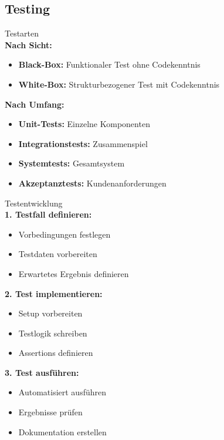 \subsection{Testing}

\begin{definition}{Testarten}\\
\textbf{Nach Sicht:}
\begin{itemize}
    \item \textbf{Black-Box:} Funktionaler Test ohne Codekenntnis
    \item \textbf{White-Box:} Strukturbezogener Test mit Codekenntnis
\end{itemize}

\textbf{Nach Umfang:}
\begin{itemize}
    \item \textbf{Unit-Tests:} Einzelne Komponenten
    \item \textbf{Integrationstests:} Zusammenspiel
    \item \textbf{Systemtests:} Gesamtsystem
    \item \textbf{Akzeptanztests:} Kundenanforderungen
\end{itemize}
\end{definition}

\begin{KR}{Testentwicklung}\\
\textbf{1. Testfall definieren:}
\begin{itemize}
    \item Vorbedingungen festlegen
    \item Testdaten vorbereiten
    \item Erwartetes Ergebnis definieren
\end{itemize}

\textbf{2. Test implementieren:}
\begin{itemize}
    \item Setup vorbereiten
    \item Testlogik schreiben
    \item Assertions definieren
\end{itemize}

\textbf{3. Test ausführen:}
\begin{itemize}
    \item Automatisiert ausführen
    \item Ergebnisse prüfen
    \item Dokumentation erstellen
\end{itemize}
\end{KR}

